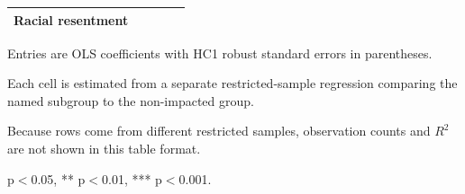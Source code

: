 \begin{table}[!htbp]
\begin{threeparttable}
\begin{tabular}{lcccc}
Racial resentment &  &  &  &  \\
\bottomrule
\end{tabular}
\begin{tablenotes}[flushleft]
\footnotesize
\item Entries are OLS coefficients with HC1 robust standard errors in parentheses.
\item Each cell is estimated from a separate restricted-sample regression comparing the named subgroup to the non-impacted group.
\item Because rows come from different restricted samples, observation counts and $R^2$ are not shown in this table format.
\item * p$<$0.05, ** p$<$0.01, *** p$<$0.001.
\end{tablenotes}
\end{threeparttable}
\end{table}
